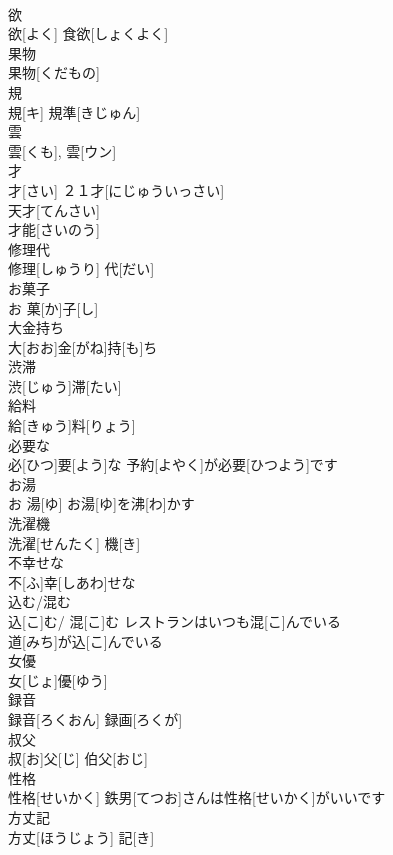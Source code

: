 \documentclass[8pt]{extreport}
\begin{document}
\begin{CJK}{UTF8}{min}
\\	欲	
\\	欲[よく]	食欲[しょくよく] 
\\	果物	
\\	果物[くだもの]	
\\	規	
\\	規[キ]	規準[きじゅん]　
\\	雲	
\\	雲[くも], 雲[ウン]	
\\	才	
\\	才[さい]	２１才[にじゅういっさい] 
\\	天才[てんさい] 
\\	才能[さいのう] 
\\	修理代	
\\	修理[しゅうり] 代[だい]	
\\	お菓子	
\\	お 菓[か]子[し]	
\\	大金持ち	
\\	大[おお]金[がね]持[も]ち	
\\	渋滞	
\\	渋[じゅう]滞[たい]	
\\	給料	
\\	給[きゅう]料[りょう]	
\\	必要な	
\\	必[ひつ]要[よう]な	予約[よやく]が必要[ひつよう]です 
\\	お湯	
\\	お 湯[ゆ]	お湯[ゆ]を沸[わ]かす 
\\	洗濯機	
\\	洗濯[せんたく] 機[き]	
\\	不幸せな	
\\	不[ふ]幸[しあわ]せな	
\\	込む/混む	
\\	込[こ]む/ 混[こ]む	レストランはいつも混[こ]んでいる 
\\	道[みち]が込[こ]んでいる 
\\	女優	
\\	女[じょ]優[ゆう]	
\\	録音	
\\	録音[ろくおん]	録画[ろくが] 
\\	叔父	
\\	叔[お]父[じ]	伯父[おじ] 
\\	性格	
\\	性格[せいかく]	鉄男[てつお]さんは性格[せいかく]がいいです　
\\	方丈記	
\\	方丈[ほうじょう] 記[き]	

\end{CJK}
\end{document}
